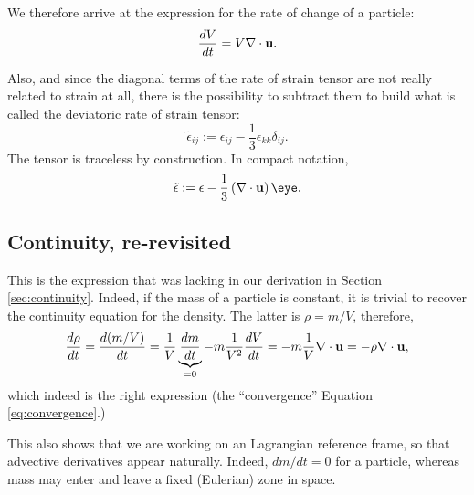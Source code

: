We therefore arrive at the expression for the rate of change of a particle:
\[
\frac{d V}{dt} = V  \nabla\cdot \mathbf{u} .
\]

Also, and since the diagonal terms of the rate of strain tensor are
not really related to strain at all, there is the possibility to subtract them
to build what is called the deviatoric  rate of strain tensor:
\[
\tilde{\epsilon}_{ij} := \epsilon_{ij} - \frac13 \epsilon_{kk} \delta_{ij} .
\]
The tensor is traceless by construction. In compact notation,
\begin{equation}\label{eq:deviatoric_rate_of_strain}
	\tilde{\epsilon} := \epsilon - \frac13 \left( \nabla\cdot \bfu \right)  \eye .
\end{equation}

\subsection{Continuity, re-revisited}
\label{sec:continuity3}

This is the expression that was lacking in our derivation in
Section \ref{sec:continuity}. Indeed, if the mass of a particle is
constant, it is trivial to recover the continuity equation for the
density. The latter is $\rho=m/V$, therefore,
\[
\frac{d \rho }{dt} =
\frac{d (m/V) }{dt} = \frac1V \underbrace{\frac{ dm }{dt}}_{=0} -
m\frac1{V^2}  \frac{ dV }{dt } =
- m\frac1{V}  \nabla\cdot \mathbf{u}  = -\rho \nabla\cdot \mathbf{u} ,
\]
which indeed is the right expression (the ``convergence'' Equation
\ref{eq:convergence}.)

This also shows that we are working on an Lagrangian reference frame, so
that advective derivatives appear naturally. Indeed, $dm/dt=0$ for a
particle, whereas mass may enter and leave a fixed (Eulerian) zone in
space.

